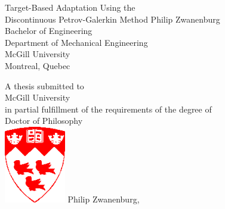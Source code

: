 \documentclass[12pt,Bold,letterpaper,TexShade]{mcgilletdclass}
\numberwithin{equation}{section}
\begin{document}
\begin{titlepage}
    \centering
    \large
    {\huge Target-Based Adaptation Using the\\Discontinuous Petrov-Galerkin Method}
    \vfill
    {\Large Philip Zwanenburg}\\
    Bachelor of Engineering\\
    \vfill
    Department of Mechanical Engineering\\
    McGill University\\
    Montreal, Quebec\\
    \vfill
    \date{\today}
    \vfill
    A thesis submitted to\\McGill University\\in partial fulfillment of the requirements of the degree of\\Doctor of Philosophy\\
    \vfill
    \includegraphics[width=0.2\textwidth]{./figures/McGillcrest.eps}
    \vfill
    {\normalsize \textcopyright\hspace{1mm}Philip Zwanenburg, \the\year}\\
    \vfill
    \vfill
\end{titlepage}


\begin{romanPagenumber}{2}%


%
%
\Acknowledge%


%
\AbstractEn%

%
%
\AbstractFr%

\begingroup
\hypersetup{linkcolor=black}
%
%
%
\tableofcontents %
\listoftables %
\listoffigures %
\endgroup

\end{romanPagenumber}
\end{document}
